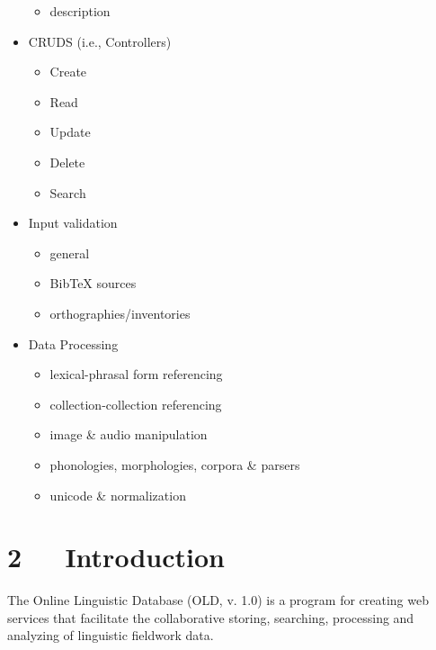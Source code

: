 \documentclass[letterpaper,10pt,english]{sphinxmanual}
\begin{document}
\begin{itemize}
\begin{itemize}
\item {} 
description

\end{itemize}

\item {} 
CRUDS (i.e., Controllers)
\begin{itemize}
\item {} 
Create

\item {} 
Read

\item {} 
Update

\item {} 
Delete

\item {} 
Search

\end{itemize}

\item {} 
Input validation
\begin{itemize}
\item {} 
general

\item {} 
BibTeX sources

\item {} 
orthographies/inventories

\end{itemize}

\item {} 
Data Processing
\begin{itemize}
\item {} 
lexical-phrasal form referencing

\item {} 
collection-collection referencing

\item {} 
image \& audio manipulation

\item {} 
phonologies, morphologies, corpora \& parsers

\item {} 
unicode \& normalization

\end{itemize}

\end{itemize}


\chapter{2   Introduction}
\label{documentation:introduction}
The Online Linguistic Database (OLD, v. 1.0) is a program for creating web
services that facilitate the collaborative storing, searching, processing and
analyzing of linguistic fieldwork data.
\end{document}
